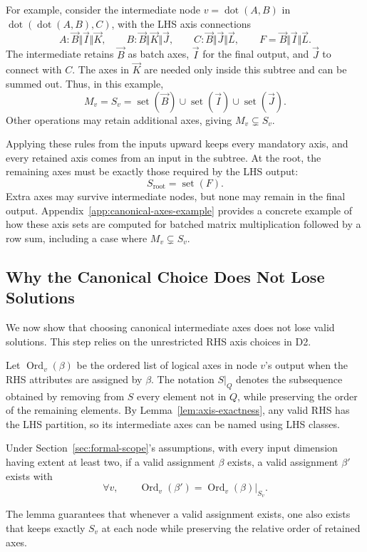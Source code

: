 For example, consider the intermediate node $v=\operatorname{dot}(A,B)$ in
$\operatorname{dot}(\operatorname{dot}(A,B),C)$, with the LHS axis connections
\begin{equation}
 A:\vec B\Vert\vec I\Vert\vec K,\qquad
 B:\vec B\Vert\vec K\Vert\vec J,\qquad
 C:\vec B\Vert\vec J\Vert\vec L,\qquad
 F=\vec B\Vert\vec I\Vert\vec L.
\end{equation}
The intermediate retains $\vec B$ as batch axes, $\vec I$ for the final
output, and $\vec J$ to connect with $C$.
The axes in $\vec K$ are needed only inside this subtree
and can be summed out. Thus, in this example,
\begin{equation}
 M_v=S_v=\operatorname{set}(\vec B)\cup\operatorname{set}(\vec I)
 \cup\operatorname{set}(\vec J).
\end{equation}
Other operations may retain additional axes, giving $M_v\subsetneq S_v$.

Applying these rules from the inputs upward keeps every mandatory axis,
and every retained axis comes from an input in the subtree. At the root,
the remaining axes must be exactly those required by the LHS output:
\begin{equation}
 S_{\mathrm{root}}=\operatorname{set}(F).
 \label{eq:root-live}
\end{equation}
Extra axes may survive intermediate nodes, but none may remain in the final
output. Appendix~\ref{app:canonical-axes-example} provides a concrete example
of how these axis sets are computed for batched matrix multiplication
followed by a row sum, including a case where $M_v\subsetneq S_v$.

\subsection{Why the Canonical Choice Does Not Lose Solutions}
\label{sec:canonicalization}
We now show that choosing canonical intermediate axes does not lose valid
solutions. This step relies on the unrestricted RHS axis choices in D2.

Let $\operatorname{Ord}_v(\beta)$ be the ordered list of logical axes
in node $v$'s output when the RHS attributes are assigned by $\beta$.
The notation $S|_Q$ denotes the subsequence obtained by removing from $S$
every element not in $Q$, while preserving the order of the remaining elements. By
Lemma~\ref{lem:axis-exactness}, any valid RHS has the LHS partition, so its
intermediate axes can be named using LHS classes.

\begin{lemma}
\label{lem:canonicalization}
Under Section~\ref{sec:formal-scope}'s assumptions, with every input dimension
having extent at least two, if a valid assignment $\beta$ exists, a valid
assignment $\beta'$ exists with
\begin{equation}
 \forall v,\qquad
 \operatorname{Ord}_v(\beta')=\operatorname{Ord}_v(\beta)|_{S_v}.
 \label{eq:canonicalization}
\end{equation}
\end{lemma}
The lemma guarantees that whenever a valid assignment exists, one also
exists that keeps exactly $S_v$ at each node while preserving the relative
order of retained axes.

